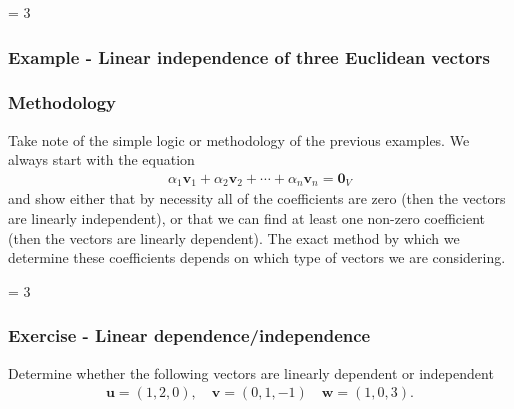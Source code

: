 \documentclass[usenames,dvipsnames,aspectratio=169,10pt]{beamer}
\def \EXAMPLEVERSION {3} %
\numberwithin{equation}{section}
\begin{document}
\ifnum \EXAMPLEVERSION = 3
\begin{frame}
\frametitle{Example - Linear independence of three Euclidean vectors}
\end{frame}

\begin{frame}
\end{frame}
\fi 



\begin{frame}
\frametitle{Methodology}

Take note of the simple logic or methodology of the previous examples. We always start with the equation
\begin{align*}
\alpha_1 \mathbf{v}_1 + \alpha_2 \mathbf{v}_2 + \cdots + \alpha_n \mathbf{v}_n = \mathbf{0}_V
\end{align*}
and show either that by necessity all of the coefficients are zero (then the vectors are linearly independent), or that we can find at least one non-zero coefficient (then the vectors are linearly dependent). The exact method by which we determine these coefficients depends on which type of vectors we are considering.

\end{frame}


\ifnum \EXAMPLEVERSION = 3
\begin{frame}
\frametitle{Exercise - Linear dependence/independence}

Determine whether the following vectors are linearly dependent or independent
\begin{align*}
\mathbf{u}=(1,2,0), \quad \mathbf{v}=(0,1,-1) \quad \mathbf{w}=(1,0,3).
\end{align*}
\end{frame}
\fi 
\end{document}
